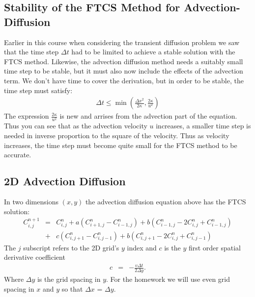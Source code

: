 \documentclass[11pt, oneside]{article}   	%
\begin{document}
\subsection*{Stability of the FTCS Method for Advection-Diffusion}
Earlier in this course when considering the transient diffusion problem we saw that the time step $\Delta t$ had to be limited to achieve a stable solution with the FTCS method.  Likewise, the advection diffusion method needs a suitably small time step to be stable, but it must also now include the effects of the advection term. We don't have time to cover the derivation, but in order to be stable, the time step must satisfy:
  \begin{eqnarray}
	\Delta t \le \min{ \left ( \frac{\Delta x^2}{2 \kappa} ,  \frac{2 \kappa}{u^2}  \right ) }
\end{eqnarray}
The expression $ \frac{2 \kappa}{u^2} $ is new and arrises from  the advection part of the equation. Thus you can see that as the advection velocity $u$ increases, a smaller time step is needed in inverse proportion to the square of the velocity. Thus as velocity increases, the time step must become quite small for the FTCS method to be accurate.


\subsection*{2D Advection Diffusion}
In two dimensions $(x,y)$ the advection diffusion equation above has the FTCS solution:
\begin{eqnarray}
	C^{n+1}_{i,j} &=& C^n_{i,j} + a \left ( {C^{n}_{i+1,j} - C^n_{i-1,j}}\right ) +  b 
\left ( {C^{n}_{i-1,j} - 2 C^n_{i,j}+C^n_{i-1,j}} \right )   \\
&+ & c \left ( {C^{n}_{i,j+1} - C^n_{i,j-1}}\right ) +  b
\left ( {C^{n}_{i,j+1} - 2 C^n_{i,j}+C^n_{i,j-1}} \right )
\end{eqnarray}
The $j$ subscript refers to the 2D grid's $y$ index and $c$ is the $y$ first order spatial derivative coefficient
\begin{eqnarray}
	c &=&  - \frac{ v \Delta t}{2\Delta y} .
\end{eqnarray}
Where  $\Delta y$ is the grid spacing in $y$. For the homework we will use even grid spacing in $x$ and $y$ so that $\Delta x$ = $\Delta y$.
\end{document}
